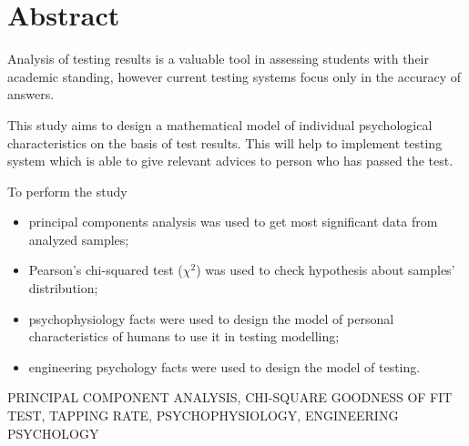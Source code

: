 \chapter*{Abstract}

Analysis of testing results is a valuable tool in assessing students
with their academic standing, however current testing systems focus
only in the accuracy of answers.

This study aims to design a mathematical model of individual
psychological characteristics on the basis of test results.
This will help to implement testing system which is able
to give relevant advices to person who has passed the test.

To perform the study
\begin{itemize}
  \item 
    principal components analysis was used
    to get most significant data from analyzed samples;
  \item
    Pearson's chi-squared test ($\chi^2$) was used to check
    hypothesis about samples' distribution;
  \item
    psychophysiology facts were used to design the model of personal
    characteristics of humans to use it in testing modelling;
  \item
    engineering psychology facts were used to design the model of testing.
\end{itemize}

\MakeUppercase{Principal Component Analysis, Chi-Square Goodness of Fit Test,
tapping rate, psychophysiology, engineering psychology}

